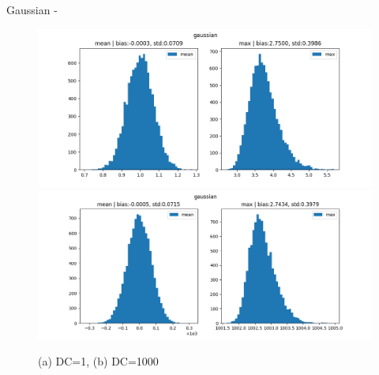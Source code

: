 \documentclass[12pt]{article}
\begin{document}
\newpage
Gaussian - 

\begin{figure}[H] 
\centering 
\includegraphics[scale=0.5]{ce-ga-low.png}
\includegraphics[scale=0.5]{ce-ga-hi.png}
\caption{(a) DC=1, (b) DC=1000}
\end{figure}
\end{document}
